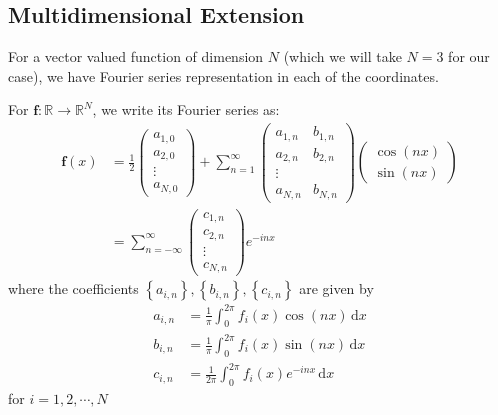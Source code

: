 \documentclass[a4paper]{article}
\newcommand{\dx}{\, \text{d} x}
\begin{document}
\subsection{Multidimensional Extension}
For a vector valued function of dimension $N$ (which we will take $N=3$ for our case), we have Fourier series representation in each of the coordinates.

For $\mathbf{f}:\mathbb{R} \rightarrow \mathbb{R}^N$, we write its Fourier series as:
\begin{align}
    \mathbf{f} (x) &= \frac{1}{2}
    \begin{pmatrix}
        a_{1,0} \\
        a_{2,0} \\
        \vdots \\
        a_{N,0}
    \end{pmatrix}
    + \sum_{n=1}^\infty
    \begin{pmatrix}
        a_{1,n} & b_{1,n} \\
        a_{2,n} & b_{2,n} \\
        \vdots \\
        a_{N,n} & b_{N,n}
    \end{pmatrix}
    \begin{pmatrix}
        \cos {\left( nx \right)} \\
        \sin {\left( nx \right)}
    \end{pmatrix}
    \\
    &= \sum_{n=-\infty}^{\infty}
    \begin{pmatrix}
        c_{1,n} \\
        c_{2,n} \\
        \vdots \\
        c_{N,n}
    \end{pmatrix}
    e^{-inx}
\end{align}
where the coefficients $\left\{ a_{i,n} \right\}, \left\{ b_{i,n} \right\}, \left\{ c_{i,n} \right\}$ are given by
\begin{align}
    a_{i,n} &= \frac{1}{\pi} \int_{0}^{2\pi} f_i (x) \cos {\left( nx \right)} \dx \\
    b_{i,n} &= \frac{1}{\pi} \int_{0}^{2\pi} f_i (x) \sin {\left( nx \right)} \dx \\
    c_{i,n} &= \frac{1}{2\pi} \int_{0}^{2\pi} f_i (x) e^{-inx} \dx
\end{align}
for $i=1, 2, \cdots, N$
\end{document}
